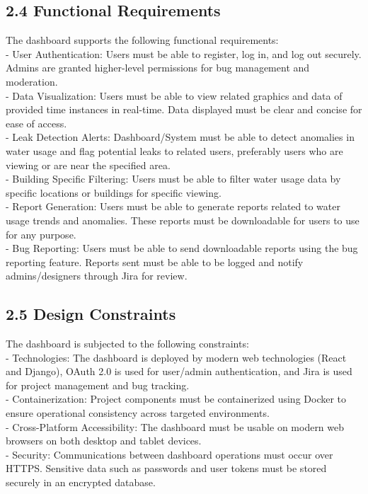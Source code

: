 \documentclass[10pt]{article}
\begin{document}
\subsection*{2.4 Functional Requirements}
The dashboard supports the following functional requirements:\\
- User Authentication: Users must be able to register, log in, and log out securely. Admins are granted higher-level permissions for bug management and moderation.\\
- Data Visualization: Users must be able to view related graphics and data of provided time instances in real-time. Data displayed must be clear and concise for ease of access.\\
- Leak Detection Alerts: Dashboard/System must be able to detect anomalies in water usage and flag potential leaks to related users, preferably users who are viewing or are near the specified area.\\
- Building Specific Filtering: Users must be able to filter water usage data by specific locations or buildings for specific viewing.\\
- Report Generation: Users must be able to generate reports related to water usage trends and anomalies. These reports must be downloadable for users to use for any purpose.\\
- Bug Reporting: Users must be able to send downloadable reports using the bug reporting feature. Reports sent must be able to be logged and notify admins/designers through Jira for review.

\subsection*{2.5 Design Constraints}
The dashboard is subjected to the following constraints:\\
- Technologies: The dashboard is deployed by modern web technologies (React and Django), OAuth 2.0 is used for user/admin authentication, and Jira is used for project management and bug tracking.\\
- Containerization: Project components must be containerized using Docker to ensure operational consistency across targeted environments.\\
- Cross-Platform Accessibility: The dashboard must be usable on modern web browsers on both desktop and tablet devices.\\
- Security: Communications between dashboard operations must occur over HTTPS. Sensitive data such as passwords and user tokens must be stored securely in an encrypted database.
\end{document}

